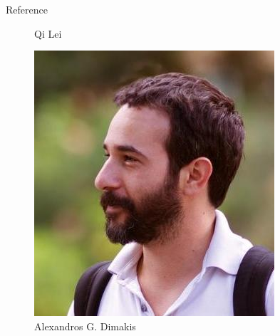 \documentclass{beamer}
\begin{document}
\begin{frame}{Reference}
\begin{figure}
\begin{minipage}[t]{.2\paperwidth}
        \caption{Qi Lei}
    \end{minipage}
    \begin{minipage}[t]{.2\paperwidth}
        \centering
        \includegraphics[width=\textwidth]{res/alexdimakis_sm.jpg}
        \caption{Alexandros G. Dimakis}
    \end{minipage}
    \begin{minipage}[t]{.2\paperwidth}
        \centering

\end{minipage}
\end{figure}
\end{frame}
\end{document}

